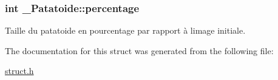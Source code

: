 \subsubsection[{\texorpdfstring{percentage}{percentage}}]{\setlength{\rightskip}{0pt plus 5cm}int \+\_\+\+Patatoide\+::percentage}\hypertarget{struct___patatoide_a3154bc1cd89cedada3ad78fe9f69c23d}{}\label{struct___patatoide_a3154bc1cd89cedada3ad78fe9f69c23d}
Taille du patatoide en pourcentage par rapport à l\textquotesingle{}image initiale. 

The documentation for this struct was generated from the following file\+:\begin{DoxyCompactItemize}
\item 
\hyperlink{struct_8h}{struct.\+h}\end{DoxyCompactItemize}
